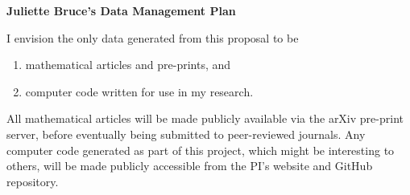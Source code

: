 \documentclass[12pt]{amsart}
\begin{document}
\begin{center}
\textbf{Juliette Bruce's Data Management Plan}
\end{center}

\vspace{1cm}
I envision the only data generated from this proposal to be 
\begin{enumerate}
	\item mathematical articles and pre-prints, and
	\item computer code written for use in my research.
\end{enumerate}
All mathematical articles will be made publicly available via the arXiv pre-print server, before eventually being submitted to peer-reviewed journals.  Any computer code generated as part of this project, which might be interesting to others, will be made publicly accessible from the PI's website and GitHub repository. 

 \pagestyle{empty}
\end{document}
